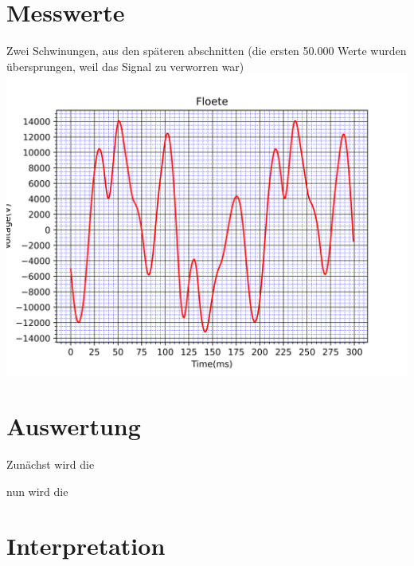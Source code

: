 \section{Messwerte}
\label{chap:VERSUCH_1_MESSWERTE}

Zwei Schwinungen, aus den späteren abschnitten (die ersten 50.000 Werte wurden übersprungen, weil das Signal zu verworren war)
\includegraphics[scale=0.6]{media/Signal_Raster.png}

\section{Auswertung}
\label{chap:VERSUCH_1_AUSWERTUNG}

Zunächst wird die

nun wird die 



\section{Interpretation}
\label{chap:VERSUCH_1_INTERPRETATION}